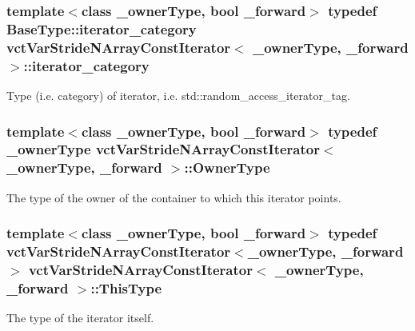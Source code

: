 \subsubsection[{iterator\+\_\+category}]{\setlength{\rightskip}{0pt plus 5cm}template$<$class \+\_\+owner\+Type, bool \+\_\+forward$>$ typedef Base\+Type\+::iterator\+\_\+category {\bf vct\+Var\+Stride\+N\+Array\+Const\+Iterator}$<$ \+\_\+owner\+Type, \+\_\+forward $>$\+::{\bf iterator\+\_\+category}}\label{classvct_var_stride_n_array_const_iterator_a09142c21a89b54a40ad29eb7972c6f78}
Type (i.\+e. category) of iterator, i.\+e. std\+::random\+\_\+access\+\_\+iterator\+\_\+tag. \hypertarget{classvct_var_stride_n_array_const_iterator_ac75d53a8defeee467ba9ebe2962e29ac}{}
\subsubsection[{Owner\+Type}]{\setlength{\rightskip}{0pt plus 5cm}template$<$class \+\_\+owner\+Type, bool \+\_\+forward$>$ typedef \+\_\+owner\+Type {\bf vct\+Var\+Stride\+N\+Array\+Const\+Iterator}$<$ \+\_\+owner\+Type, \+\_\+forward $>$\+::{\bf Owner\+Type}}\label{classvct_var_stride_n_array_const_iterator_ac75d53a8defeee467ba9ebe2962e29ac}
The type of the owner of the container to which this iterator points. \hypertarget{classvct_var_stride_n_array_const_iterator_ac729d2af265785aad6fdd43a70fbffdb}{}
\subsubsection[{This\+Type}]{\setlength{\rightskip}{0pt plus 5cm}template$<$class \+\_\+owner\+Type, bool \+\_\+forward$>$ typedef {\bf vct\+Var\+Stride\+N\+Array\+Const\+Iterator}$<$\+\_\+owner\+Type, \+\_\+forward$>$ {\bf vct\+Var\+Stride\+N\+Array\+Const\+Iterator}$<$ \+\_\+owner\+Type, \+\_\+forward $>$\+::{\bf This\+Type}}\label{classvct_var_stride_n_array_const_iterator_ac729d2af265785aad6fdd43a70fbffdb}
The type of the iterator itself. 

